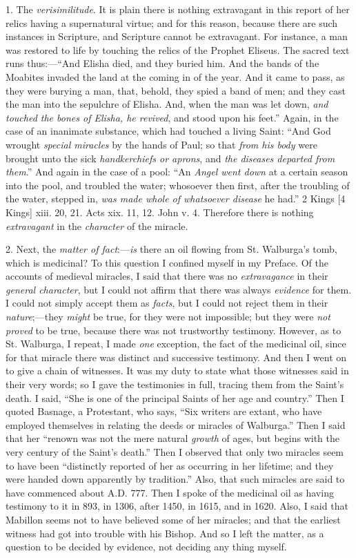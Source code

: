 1. The \emph{verisimilitude}. It is plain there is nothing extravagant in this report of
her relics having a supernatural virtue; and for this reason, because there are such
instances in Scripture, and Scripture cannot be extravagant. For
instance, a man was restored to life by touching the relics of the
Prophet Eliseus. The sacred text runs thus:—``And Elisha died, and
they buried him. And the bands of the Moabites invaded the land at the
coming in of the year. And it came to pass, as they were burying a man,
that, behold, they spied a band of men; and they cast the man into the
sepulchre of Elisha. And, when the man was let down, \emph{and touched the
bones of Elisha, he revived}, and stood upon his feet.'' Again,
in the case of an inanimate substance, which had touched a living Saint:
``And God wrought \emph{special miracles} by the hands of Paul; so that
\emph{from
his body} were brought unto the sick \emph{handkerchiefs or aprons},
and \emph{the diseases departed from them}.'' And again in the case
of a pool: ``An \emph{Angel went down} at a certain season into the
pool, and troubled the water; whosoever then first, after the troubling
of the water, stepped in, \emph{was made whole of whatsoever disease} he
had.'' 2 Kings [4 Kings] xiii. 20, 21. Acts xix. 11, 12. John v. 4. Therefore there is
nothing \emph{extravagant} in the \emph{character} of the miracle.

2. Next, the \emph{matter of fact}:—\emph{is}
there an oil flowing from St. Walburga's tomb, which is medicinal? To
this question I confined myself in my Preface. Of the accounts of medieval miracles, I said
that there was no \emph{extravagance} in their \emph{general character},
but I could not affirm that there was always \emph{evidence} for them. I
could not simply accept them as \emph{facts}, but I could not reject
them in their \emph{nature};—they \emph{might} be true, for
they were not impossible; but they were \emph{not proved} to be true,
because there was not trustworthy testimony. However, as to St. Walburga,
I repeat, I made \emph{one} exception, the fact of the medicinal oil, since for
that miracle there was distinct and successive testimony. And then I
went on to give a chain of witnesses. It was my duty to state what those
witnesses said in their very words; so I gave the
testimonies in full, tracing them from the Saint's death. I said,
``She is one of the principal Saints of her age and country.''
Then I quoted Basnage, a Protestant, who says, ``Six writers are
extant, who have employed themselves in relating the deeds or miracles
of Walburga.'' Then I said that her ``renown was not the mere
natural \emph{growth} of ages, but begins with the very century of the
Saint's death.'' Then I observed that only two miracles seem to have
been ``distinctly reported of her as occurring in her lifetime; and
they were handed down apparently by tradition.'' Also, that such
miracles are said to have commenced about A.D. 777. Then I spoke of the
medicinal oil as having testimony to it in 893, in 1306, after 1450, in
1615, and in 1620. Also, I said that Mabillon seems not to have believed
some of her miracles; and that the earliest witness had got into
trouble with his Bishop. And so I left the matter, as a question to be decided by evidence, not deciding any thing
myself.

